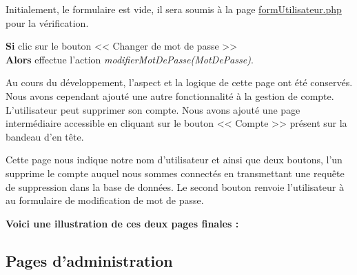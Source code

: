 			\begin{paragraphe}
				Initialement, le formulaire est vide, il sera soumis à la page \underline{formUtilisateur.php} pour la vérification.
			\end{paragraphe}


			\begin{paragraphe}
				\textbf{Si} clic sur le bouton << Changer de mot de passe >> \\
				\textbf{Alors} effectue l'action \emph{modifierMotDePasse(MotDePasse)}.
			\end{paragraphe}

        \newpage
        
            \begin{paragraphe}
               Au cours du développement, l'aspect et la logique de cette page ont été conservés. Nous avons cependant ajouté une autre fonctionnalité
               à la gestion de compte. L'utilisateur peut supprimer son compte. Nous avons ajouté une page intermédiaire accessible en cliquant sur le bouton
               << Compte >> présent sur la bandeau d'en tête.
            \end{paragraphe}
               
            \begin{paragraphe}
                Cette page nous indique notre nom d'utilisateur et ainsi que deux boutons, l'un supprime le compte auquel nous sommes connectés en transmettant une requête de suppression dans la
                base de données. Le second bouton renvoie l'utilisateur à au formulaire de modification de mot de passe.
            \end{paragraphe}

            \begin{paragraphe}
                \textbf{Voici une illustration de ces deux pages finales :}
            \end{paragraphe}



	\clearpage

	\subsection{Pages d'administration}

